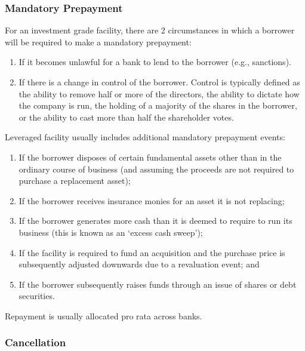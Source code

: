 \documentclass[
]{article}
\providecommand{\tightlist}{%
  \setlength{\itemsep}{0pt}\setlength{\parskip}{0pt}}
\begin{document}
\hypertarget{mandatory-prepayment}{%
\subsubsection{Mandatory Prepayment}\label{mandatory-prepayment}}

For an investment grade facility, there are 2 circumstances in which a
borrower will be required to make a mandatory prepayment:

\begin{enumerate}
\tightlist
\item
  If it becomes unlawful for a bank to lend to the borrower (e.g.,
  sanctions).
\item
  If there is a change in control of the borrower. Control is typically
  defined as the ability to remove half or more of the directors, the
  ability to dictate how the company is run, the holding of a majority
  of the shares in the borrower, or the ability to cast more than half
  the shareholder votes.
\end{enumerate}

Leveraged facility usually includes additional mandatory prepayment
events:

\begin{enumerate}
\tightlist
\item
  If the borrower disposes of certain fundamental assets other than in
  the ordinary course of business (and assuming the proceeds are not
  required to purchase a replacement asset);
\item
  If the borrower receives insurance monies for an asset it is not
  replacing;
\item
  If the borrower generates more cash than it is deemed to require to
  run its business (this is known as an `excess cash sweep');
\item
  If the facility is required to fund an acquisition and the purchase
  price is subsequently adjusted downwards due to a revaluation event;
  and
\item
  If the borrower subsequently raises funds through an issue of shares
  or debt securities.
\end{enumerate}

Repayment is usually allocated pro rata across banks.

\hypertarget{cancellation}{%
\subsubsection{Cancellation}\label{cancellation}}
\end{document}
